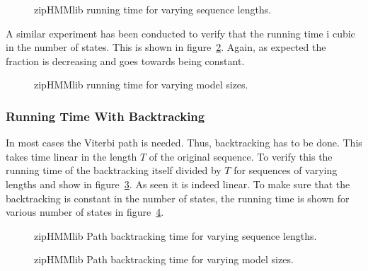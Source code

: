 \begin{figure}
  \centering
  
  \caption{zipHMMlib running time for varying sequence lengths.}
  \label{fig:assymptotic_viterbi_n}
\end{figure}

A similar experiment has been conducted to verify that the running time i cubic
in the number of states. This is shown in
figure~\ref{fig:assymptotic_viterbi_k}. Again, as expected the fraction is
decreasing and goes towards being constant.

\begin{figure}
  \centering
  
  \caption{zipHMMlib running time for varying model sizes.}
  \label{fig:assymptotic_viterbi_k}
\end{figure}

\subsubsection{Running Time With Backtracking}
\label{sec:running-time-with-1}

In most cases the Viterbi path is needed. Thus, backtracking has to be
done. This takes time linear in the length $T$ of the original sequence. To verify
this the running time of the backtracking itself divided by $T$ for sequences
of varying lengths and show in
figure~\ref{fig:assymptotic_viterbi_backtrack_n}. As seen it is indeed
linear. To make sure that the backtracking is constant in the number of states,
the running time is shown for various number of states in
figure~\ref{fig:assymptotic_viterbi_backtrack_k}. 

\begin{figure}
  \centering
  
  \caption{zipHMMlib Path backtracking time for varying sequence lengths.}
  \label{fig:assymptotic_viterbi_backtrack_n}
\end{figure}

\begin{figure}
  \centering
  
  \caption{zipHMMlib Path backtracking time for varying model sizes.}
  \label{fig:assymptotic_viterbi_backtrack_k}
\end{figure}

